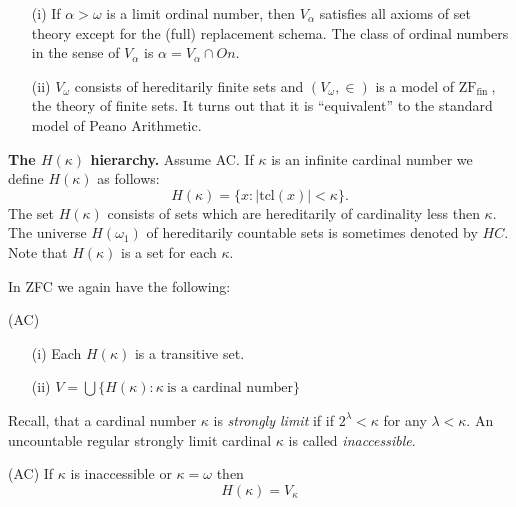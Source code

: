 \begin{proposition}\label{valphaApprox}
\begin{itemize}
 \item[]
 \item[(i)] If $\alpha>\omega$ is a limit ordinal number, then $V_\alpha$ satisfies all axioms
 of set theory except for the (full) replacement schema. The class of ordinal numbers in the sense of $V_\alpha$ is
 $\alpha=V_\alpha\cap On$.
 \item[(ii)] $V_\omega$ consists of hereditarily finite sets and
	$(V_\omega,\in)$ is a model of $\mbox{ZF}_{\mbox{fin}} \ $,
	the theory of finite sets. It turns out that it is ``equivalent''
	to the standard model of Peano Arithmetic.
\end{itemize}
\end{proposition}




\begin{definition}\label{H-kappa}{\bf The $H(\kappa)$ hierarchy.} Assume AC. If $\kappa$ is an infinite cardinal number we define
$H(\kappa)$ as follows:
$$ %
 H(\kappa) = \{x:|\mbox{tcl}(x)|<\kappa\}.
$$ %
The set $H(\kappa)$ consists of sets which are hereditarily of cardinality  less then
$\kappa$. The universe $H(\omega_1)$ of hereditarily countable
sets is sometimes denoted by $HC$. Note that $H(\kappa)$ is a set for each $\kappa$.
\end{definition}

In ZFC we again have the following:

\begin{proposition}{\rm (AC)}
 \begin{itemize}
  \item[(i)] Each $H(\kappa)$ is a transitive set.
  \item[(ii)] $V=\bigcup\{H(\kappa):\kappa\ \mbox{is a cardinal number}\}$
 \end{itemize}
\end{proposition}

\begin{definition}\label{strong-limit} Recall, that a cardinal number $\kappa$ is \emph{strongly limit} if
if $2^\lambda<\kappa$ for any $\lambda<\kappa$. An uncountable regular strongly limit cardinal $\kappa$
is called \emph{inaccessible}.
\end{definition}
\begin{proposition}{\rm (AC)} If $\kappa$ is inaccessible or $\kappa=\omega$ then
    $$H(\kappa)=V_\kappa$$
\end{proposition}

